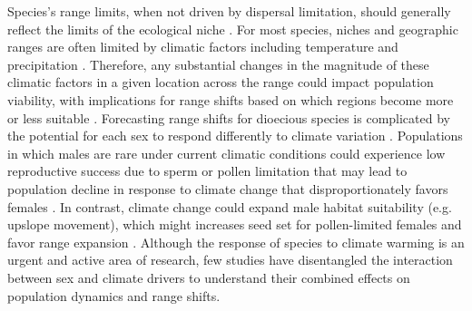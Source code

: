 \documentclass[12pt]{article}
\begin{document}
Species's range limits, when not driven by dispersal limitation, should generally reflect the limits of the ecological niche \citep{lee2016synthesis}.
For most species, niches and geographic ranges are often limited by climatic factors including temperature and precipitation \citep{sexton2009evolution}. 
Therefore, any substantial changes in the magnitude of these climatic factors in a given location across the range could impact population viability, with implications for range shifts based on which regions become more or less suitable  \citep{davis2001range, pease1989model}. 
Forecasting range shifts for dioecious species is complicated by the potential for each sex to respond differently to climate variation \citep{pottier2021sexual,morrison2016causes}.
Populations in which males are rare under current climatic conditions could experience low reproductive success due to sperm or pollen limitation that may lead to population decline in response to climate change that disproportionately favors females \citep{eberhart2017sex}.
In contrast, climate change could expand male habitat suitability (e.g. upslope movement), which might increases seed set for pollen-limited females and favor range expansion \citep{petry2016sex}.
Although the response of species to climate warming is an urgent and active area of research, few studies have disentangled the interaction between sex and climate drivers to understand their combined effects on population dynamics and range shifts.  
\end{document}
